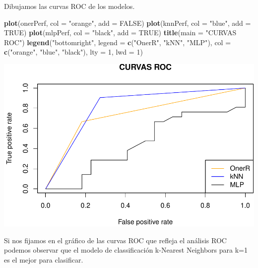 \documentclass[]{article}
\newenvironment{Shaded}{\begin{snugshade}}{\end{snugshade}}
\newcommand{\DataTypeTok}[1]{\textcolor[rgb]{0.13,0.29,0.53}{#1}}
\newcommand{\DecValTok}[1]{\textcolor[rgb]{0.00,0.00,0.81}{#1}}
\newcommand{\KeywordTok}[1]{\textcolor[rgb]{0.13,0.29,0.53}{\textbf{#1}}}
\newcommand{\NormalTok}[1]{#1}
\newcommand{\OperatorTok}[1]{\textcolor[rgb]{0.81,0.36,0.00}{\textbf{#1}}}
\newcommand{\OtherTok}[1]{\textcolor[rgb]{0.56,0.35,0.01}{#1}}
\newcommand{\StringTok}[1]{\textcolor[rgb]{0.31,0.60,0.02}{#1}}
\begin{document}
\begin{Shaded}
\end{Shaded}

Dibujamos las curvas ROC de los modelos.

\begin{Shaded}
\begin{Highlighting}[]
\KeywordTok{plot}\NormalTok{(onerPerf, }\DataTypeTok{col =} \StringTok{"orange"}\NormalTok{, }\DataTypeTok{add =} \OtherTok{FALSE}\NormalTok{)}
\KeywordTok{plot}\NormalTok{(knnPerf, }\DataTypeTok{col =} \StringTok{"blue"}\NormalTok{, }\DataTypeTok{add =} \OtherTok{TRUE}\NormalTok{)}
\KeywordTok{plot}\NormalTok{(mlpPerf, }\DataTypeTok{col =} \StringTok{"black"}\NormalTok{, }\DataTypeTok{add =} \OtherTok{TRUE}\NormalTok{)}
\KeywordTok{title}\NormalTok{(}\DataTypeTok{main =} \StringTok{"CURVAS ROC"}\NormalTok{)}
\KeywordTok{legend}\NormalTok{(}\StringTok{"bottomright"}\NormalTok{, }\DataTypeTok{legend =} \KeywordTok{c}\NormalTok{(}\StringTok{"OnerR"}\NormalTok{, }\StringTok{"kNN"}\NormalTok{, }\StringTok{"MLP"}\NormalTok{), }\DataTypeTok{col =} \KeywordTok{c}\NormalTok{(}\StringTok{"orange"}\NormalTok{, }\StringTok{"blue"}\NormalTok{, }\StringTok{"black"}\NormalTok{), }\DataTypeTok{lty =} \DecValTok{1}\NormalTok{, }\DataTypeTok{lwd =} \DecValTok{1}\NormalTok{)}
\end{Highlighting}
\end{Shaded}

\includegraphics{document_files/figure-latex/unnamed-chunk-12-1.pdf}

Si nos fijamos en el gráfico de las curvas ROC que refleja el análisis
ROC podemos observar que el modelo de classificación k-Nearest Neighbors
para k=1 es el mejor para clasificar.
\end{document}
